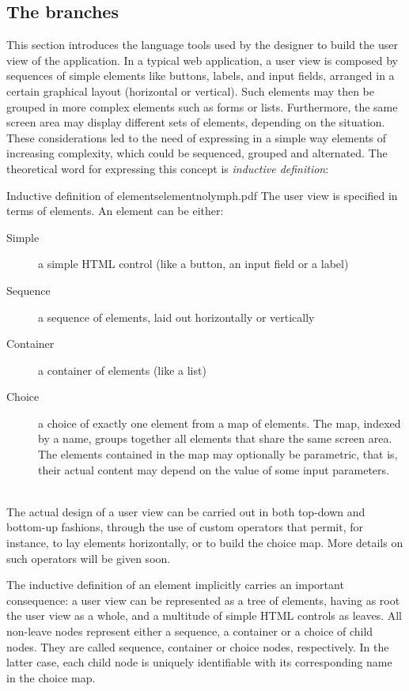 \documentclass[12pt]{article} %
\begin{document}
\subsection{The branches}\label{branches}
This section introduces the language tools used by the designer to build the user view of the application. In a typical web application, a user view is composed by sequences of simple elements like buttons, labels, and input fields, arranged in a certain graphical layout (horizontal or vertical). Such elements may then be grouped in more complex elements such as forms or lists. Furthermore, the same screen area may display different sets of elements, depending on the situation. These considerations led to the need of expressing in a simple way elements of increasing complexity, which could be sequenced, grouped and alternated. The theoretical word for expressing this concept is \emph{inductive definition}:\\
\begin{dce}{Inductive definition of elements}{element}{nolymph.pdf}
The user view is specified in terms of elements. An element can be either: 
\begin{description}
\item[Simple] a simple HTML control (like a button, an input field or a label)
\item[Sequence] a sequence of elements, laid out horizontally or vertically
\item[Container] a container of elements (like a list)
\item[Choice] a choice of exactly one element from a map of elements. The map, indexed by a name, groups together all elements that share the same screen area. The elements contained in the map may optionally be parametric, that is, their actual content may depend on the value of some input parameters.
\end{description}
\end{dce}
~\\
The actual design of a user view can be carried out in both top-down and bottom-up fashions, through the use of custom operators that permit, for instance, to lay elements horizontally, or to build the choice map. More details on such operators will be given soon.

The inductive definition of an element implicitly carries an important consequence: a user view can be represented as a tree of elements, having as root the user view as a whole, and a multitude of simple HTML controls as leaves. All non-leave nodes represent either a sequence, a container or a choice of child nodes. They are called sequence, container or choice nodes, respectively. In the latter case, each child node is uniquely identifiable with its corresponding name in the choice map.
\end{document}
